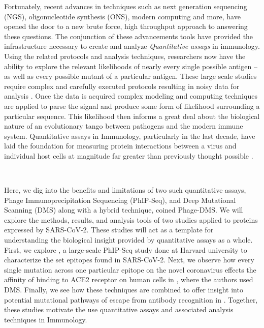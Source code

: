 \documentclass{article}
\begin{document}
Fortunately, recent advances in techniques such as next generation sequencing (NGS), oligonucleotide synthesis (ONS), modern computing and more, have opened the door to a new brute force, high throughput approach to answering these questions.
The conjunction of these  advancements tools have provided the infrastructure necessary to create and analyze \textit{Quantitative assays} in immunology.
Using the related protocols and analysis techniques, researchers now have the ability to explore the relevant likelihoods of nearly every single possible antigen -- as well as every possible mutant of a particular antigen.
These large scale studies require complex and carefully executed protocols resulting in noisy data for analysis \citep{Mohan2018}.
Once the data is acquired complex modeling and computing techniques are applied to parse the signal and produce some form of likelihood surrounding a particular sequence.
This likelihood then informs a great deal about the biological nature of an evolutionary tango between pathogens and the modern immune system.
Quantitative assays in Immunology, particularly in the last decade, have laid the foundation for measuring protein interactions between a virus and individual host cells at magnitude far greater than previously thought possible \citep{Fowler2014, Bloom2014}.

~ 

Here, we dig into the benefits and limitations of two such quantitative assays, Phage Immunoprecipitation Sequencing (PhIP-Seq), and Deep Mutational Scanning (DMS) along with a hybrid technique, coined Phage-DMS. 
We will explore the methods, results, and analysis tools of two studies applied to proteins expressed by SARS-CoV-2.
These studies will act as a template for understanding the biological insight provided by quantitative assays as a whole.
First, we explore \citet{Shrock2020}, a large-scale PhIP-Seq study done at Harvard university to characterize the set epitopes found in SARS-CoV-2.
Next, we observe how every single mutation across one particular epitope on the novel coronavirus effects the affinity of binding to ACE2 receptor on human cells in \cite{Starr2020}, where the authors used DMS.
Finally, we see how these techniques are combined to offer insight into potential mutational pathways of escape from antibody recognition in \citet{Garrett2020}.
Together, these studies motivate the use quantitative assays and associated analysis techniques in Immunology.
\end{document}
